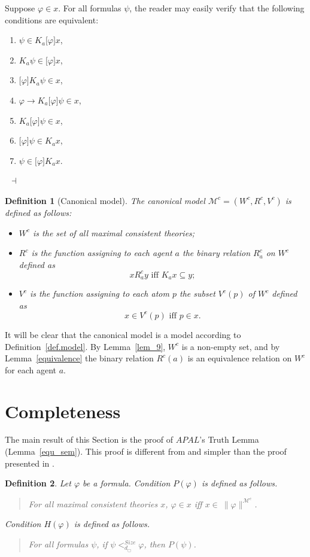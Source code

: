 \documentclass{article}[12pt]
\newenvironment{proof}{\noindent {\bf Proof \ }}{\hfill ~$\dashv$}
\newtheorem{definition}{Definition}
\renewcommand{\phi}{\varphi}
\begin{document}
\begin{proof}
Suppose $\phi\in x$.
For all formulas $\psi$, the reader may easily verify that the following conditions are equivalent:
\begin{enumerate}
\item $\psi\in K_{a}\lbrack\phi\rbrack x$,
\item $K_{a}\psi\in\lbrack\phi\rbrack x$,
\item $\lbrack\phi\rbrack K_{a}\psi\in x$,
\item $\phi\rightarrow K_{a}\lbrack\phi\rbrack\psi\in x$,
\item $K_{a}\lbrack\phi\rbrack\psi\in x$,
\item $\lbrack\phi\rbrack\psi\in K_{a}x$,
\item $\psi\in\lbrack\phi\rbrack K_{a}x$.
\end{enumerate}
\end{proof}
\begin{definition}[Canonical model]
The {\em canonical model} $\mathcal{M}^{c}=(W^{c},R^{c},V^{c})$ is defined as follows:
\begin{itemize}
\item $W^{c}$ is the set of all maximal consistent theories;
\item $R^{c}$ is the function assigning to each agent $a$ the binary relation $R^{c}_a$ on $W^{c}$ defined as \[ xR^{c}_a y \text{ iff } K_{a}x\subseteq y; \]
\item $V^{c}$ is the function assigning to each atom $p$ the subset $V^{c}(p)$ of $W^{c}$ defined as \[ x\in V^{c}(p) \text{ iff } p\in x. \]
\end{itemize}
\end{definition}
It will be clear that the canonical model is a model according to Definition~\ref{def.model}.  By Lemma~\ref{lem_9}, $W^{c}$ is a non-empty set, and by Lemma~\ref{equivalence} the binary relation $R^{c}(a)$ is an equivalence relation on $W^{c}$ for each agent $a$.
\section{Completeness}
The main result of this Section is the proof of $APAL$'s Truth Lemma (Lemma~\ref{equ_sem}).
This proof is different from and simpler than the proof presented in \cite{balbianietal:2008}.

\begin{definition}
Let $\phi$ be a formula. Condition $P(\phi)$ is defined as follows.  \begin{quote} For all maximal consistent theories $x$,  $\phi\in x$ iff $x\in \ \parallel\phi\parallel^{\mathcal{M}^{c}}$. \end{quote}
Condition $H(\phi)$ is defined as follows. \begin{quote} For all formulas $\psi$, if $\psi<_{d_{\Box}}^{Size}\phi$, then $P(\psi)$. \end{quote}
\end{definition}
\end{document}

